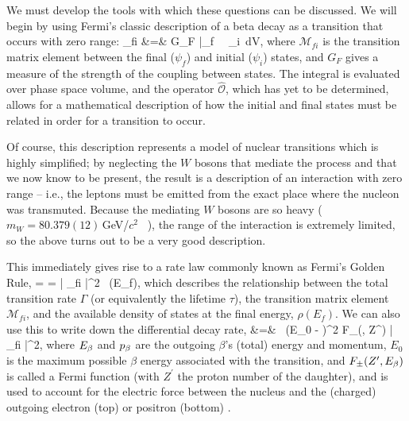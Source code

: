 We must develop the tools with which these questions can be discussed.  We will begin by using Fermi's classic description of a beta decay as a transition that occurs with zero range:
\bea
{}_{fi} &=& G_F \int \bar{\psi}_f \,  \, \psi_i \,\textrm{d}V,
\label{eq:fermitransition}
\eea 
where $\mathcal{M}_{fi}$ is the transition matrix element between the final ($\psi_f$) and initial ($\psi_i$) states, and $G_F$ gives a measure of the strength of the coupling between states.  The integral is evaluated over phase space volume, and the operator $\mathcal{\hat{O}}$, which has yet to be determined, allows for a mathematical description of how the initial and final states must be related in order for a transition to occur.

Of course, this description represents a model of nuclear transitions which is highly simplified;  by neglecting the $W$ bosons that mediate the process and that we now know to be present, the result is a description of an interaction with zero range -- i.e., the leptons must be emitted from the exact place where the nucleon was transmuted.  Because the mediating $W$ bosons are so heavy ($m_W = 80.379(12)$\,GeV/$c^2$ ~\cite{pdg2018}), the range of the interaction is extremely limited, so the above turns out to be a very good description.  

This immediately gives rise to a rate law commonly known as Fermi's Golden Rule, 
\beq
\Gamma \;\; = \;\;   \;\; = \;\; \frac{2\pi}{\hbar} \left| _{fi} \right|^2 \, \rho(E_f),
\eeq
which describes the relationship between the total transition rate $\Gamma$ (or equivalently the lifetime $\tau$), the transition matrix element $\mathcal{M}_{fi}$, and the available density of states at the final energy, $\rho(E_f)$.  We can also use this to write down the differential decay rate, 
\bea
{} 
&=&  \, \pbeta \Ebeta (E_0 - \Ebeta)^2 F_{\pm}(\Ebeta, Z^\prime) \left| _{fi} \right|^2,
\label{eq:fermidifferentialdecayrate}
\eea
where 
$E_{\beta}$ and $p_{\beta}$ are the outgoing $\beta$'s (total) energy and momentum,
$E_0$ is the maximum possible $\beta$ energy associated with the transition, 
and $F_{\pm}(Z^\prime, E_\beta)$ is called a Fermi function (with $Z^\prime$ the proton number of the daughter), and is used to account for the electric force between the nucleus and the (charged) outgoing electron (top) or positron (bottom) \cite{Fermi1934Italian}\cite{Fermi1934German}\cite{krane}.  

